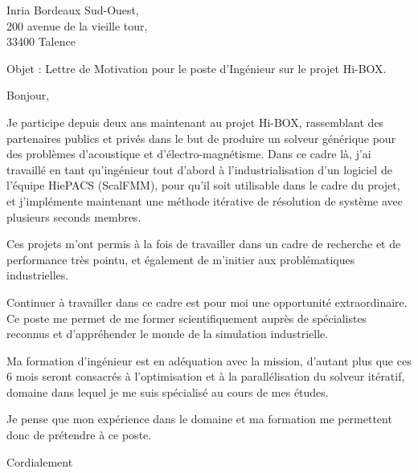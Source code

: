 \documentclass[12pt,a4paper]{letter}
\begin{document}
\begin{letter}{Inria Bordeaux Sud-Ouest,\\
    200 avenue de la vieille tour, \\
    33400 Talence}

  \opening{Objet : Lettre de Motivation pour le poste d'Ingénieur sur
    le projet Hi-BOX.}

  Bonjour,

  Je participe depuis deux ans maintenant au projet Hi-BOX,
  rassemblant des partenaires publics et privés dans le but de
  produire un solveur générique pour des problèmes d'acoustique et
  d'électro-magnétisme. Dans ce cadre là, j'ai travaillé en tant
  qu'ingénieur tout d'abord à l'industrialisation d'un logiciel de
  l'équipe HiePACS (ScalFMM), pour qu'il soit utilisable dans le cadre
  du projet, et j'implémente maintenant une méthode itérative de
  résolution de système avec plusieurs seconds membres.

  Ces projets m'ont permis à la fois de travailler dans un cadre de
  recherche et de performance très pointu, et également de m'initier
  aux problématiques industrielles.

  Continuer à travailler dans ce cadre est pour moi une opportunité
  extraordinaire. Ce poste me permet de me former scientifiquement
  auprès de spécialistes reconnus et d'appréhender le monde de la
  simulation industrielle.

  Ma formation d'ingénieur est en adéquation avec la mission, d'autant
  plus que ces 6 mois seront consacrés à l'optimisation et à la
  parallélisation du solveur itératif, domaine dans lequel je me suis
  spécialisé au cours de mes études.

  Je pense que mon expérience dans le domaine et ma formation me
  permettent donc de prétendre à ce poste.

  \closing{Cordialement}


\end{letter}
\end{document}
